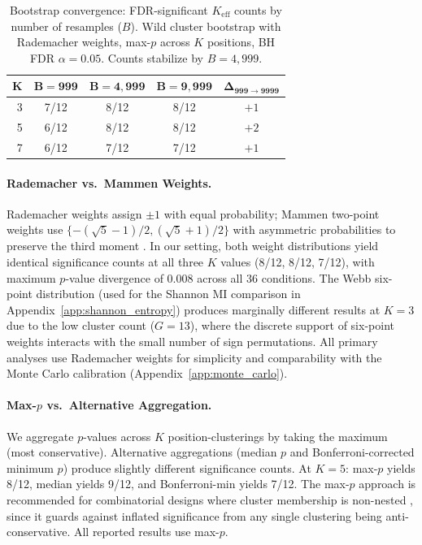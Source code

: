 \begin{table}[h]
\centering
\small
\caption{Bootstrap convergence: FDR-significant $K_{\mathrm{eff}}$ counts by number of resamples ($B$). Wild cluster bootstrap with Rademacher weights, max-$p$ across $K$ positions, BH FDR $\alpha{=}0.05$. Counts stabilize by $B{=}4{,}999$.}
\label{tab:bootstrap_B}
\begin{tabular}{rcccc}
\toprule
$\boldsymbol{K}$ & $\boldsymbol{B{=}999}$ & $\boldsymbol{B{=}4{,}999}$ & $\boldsymbol{B{=}9{,}999}$ & $\boldsymbol{\Delta_{999 \to 9999}}$ \\
\midrule
3 & 7/12 & 8/12 & 8/12 & $+1$ \\
5 & 6/12 & 8/12 & 8/12 & $+2$ \\
7 & 6/12 & 7/12 & 7/12 & $+1$ \\
\bottomrule
\end{tabular}
\end{table}

\paragraph{Rademacher vs.\ Mammen Weights.} Rademacher weights assign $\pm 1$ with equal probability; Mammen two-point weights use $\{-(\sqrt{5}-1)/2, (\sqrt{5}+1)/2\}$ with asymmetric probabilities to preserve the third moment \citep{mackinnon2018wild}. In our setting, both weight distributions yield identical significance counts at all three $K$ values (8/12, 8/12, 7/12), with maximum $p$-value divergence of 0.008 across all 36 conditions. The Webb six-point distribution (used for the Shannon MI comparison in Appendix~\ref{app:shannon_entropy}) produces marginally different results at $K{=}3$ due to the low cluster count ($G{=}13$), where the discrete support of six-point weights interacts with the small number of sign permutations. All primary analyses use Rademacher weights for simplicity and comparability with the Monte Carlo calibration (Appendix~\ref{app:monte_carlo}).

\paragraph{Max-$p$ vs.\ Alternative Aggregation.} We aggregate $p$-values across $K$ position-clusterings by taking the maximum (most conservative). Alternative aggregations (median $p$ and Bonferroni-corrected minimum $p$) produce slightly different significance counts. At $K{=}5$: max-$p$ yields 8/12, median yields 9/12, and Bonferroni-min yields 7/12. The max-$p$ approach is recommended for combinatorial designs where cluster membership is non-nested \citep{mackinnon2018wild}, since it guards against inflated significance from any single clustering being anti-conservative. All reported results use max-$p$.

